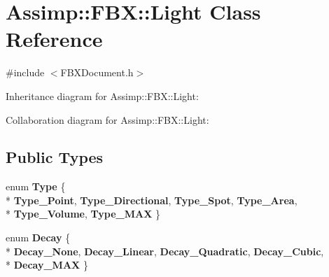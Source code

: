 \hypertarget{class_assimp_1_1_f_b_x_1_1_light}{\section{Assimp\+:\+:F\+B\+X\+:\+:Light Class Reference}
\label{class_assimp_1_1_f_b_x_1_1_light}
}


{\ttfamily \#include $<$F\+B\+X\+Document.\+h$>$}



Inheritance diagram for Assimp\+:\+:F\+B\+X\+:\+:Light\+:


Collaboration diagram for Assimp\+:\+:F\+B\+X\+:\+:Light\+:
\subsection*{Public Types}
\begin{DoxyCompactItemize}
\item 
\hypertarget{class_assimp_1_1_f_b_x_1_1_light_add5c0edddd3ed737f452f5680df995aa}{enum {\bfseries Type} \{ \\*
{\bfseries Type\+\_\+\+Point}, 
{\bfseries Type\+\_\+\+Directional}, 
{\bfseries Type\+\_\+\+Spot}, 
{\bfseries Type\+\_\+\+Area}, 
\\*
{\bfseries Type\+\_\+\+Volume}, 
{\bfseries Type\+\_\+\+M\+A\+X}
 \}}\label{class_assimp_1_1_f_b_x_1_1_light_add5c0edddd3ed737f452f5680df995aa}

\item 
\hypertarget{class_assimp_1_1_f_b_x_1_1_light_ac033e9e5052b359047404b1d050e0dad}{enum {\bfseries Decay} \{ \\*
{\bfseries Decay\+\_\+\+None}, 
{\bfseries Decay\+\_\+\+Linear}, 
{\bfseries Decay\+\_\+\+Quadratic}, 
{\bfseries Decay\+\_\+\+Cubic}, 
\\*
{\bfseries Decay\+\_\+\+M\+A\+X}
 \}}\label{class_assimp_1_1_f_b_x_1_1_light_ac033e9e5052b359047404b1d050e0dad}

\end{DoxyCompactItemize}
